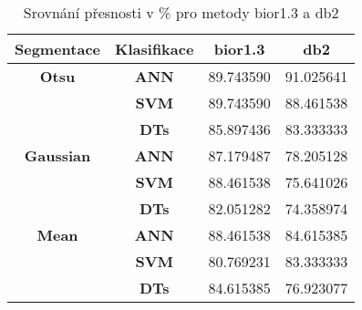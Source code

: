\capstartfalse
\begin{table}[!htbp]
\centering
\begin{tabular}{|c|c|c|c|}
\hline
\textbf{Segmentace} & \textbf{Klasifikace} & \textbf{bior1.3} & \textbf{db2} \\ \hline
\textbf{Otsu}       & \textbf{ANN}         & 89.743590        & 91.025641    \\ \hline
\textbf{}           & \textbf{SVM}         & 89.743590        & 88.461538    \\ \hline
\textbf{}           & \textbf{DTs}         & 85.897436        & 83.333333    \\ \hline
\textbf{Gaussian}   & \textbf{ANN}         & 87.179487        & 78.205128    \\ \hline
\textbf{}           & \textbf{SVM}         & 88.461538        & 75.641026    \\ \hline
\textbf{}           & \textbf{DTs}         & 82.051282        & 74.358974    \\ \hline
\textbf{Mean}       & \textbf{ANN}         & 88.461538        & 84.615385    \\ \hline
\textbf{}           & \textbf{SVM}         & 80.769231        & 83.333333    \\ \hline
\textbf{}           & \textbf{DTs}         & 84.615385        & 76.923077    \\ \hline
\end{tabular}
\caption{Srovnání přesnosti v \% pro metody bior1.3 a db2 }
\end{table}
\capstarttrue


